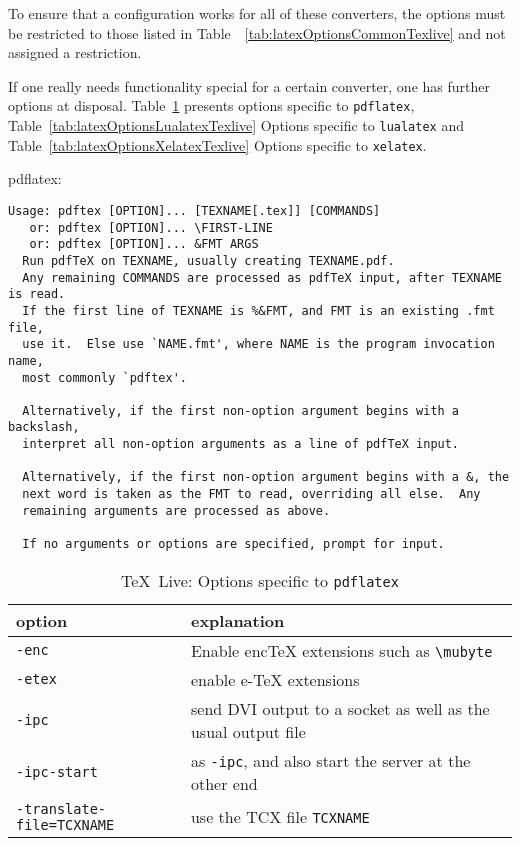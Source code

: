 \documentclass{article}
\newcommand{\pdflatex}{\texttt{pdflatex}}
\newcommand{\lualatex}{\texttt{lualatex}}
\newcommand{\xelatex}{\texttt{xelatex}}
\newcommand{\texlive}{\TeX~Live}
\begin{document}
To ensure that a configuration works for all of these converters, 
the options must be restricted to those listed in Table~~\ref{tab:latexOptionsCommonTexlive} 
and not assigned a restriction. 

If one really needs functionality special for a certain converter, 
one has further options at disposal. 
Table~\ref{tab:latexOptionsPdflatexTexlive} presents options specific to \pdflatex{}, 
Table~\ref{tab:latexOptionsLualatexTexlive} Options specific to \lualatex{} and 
Table~\ref{tab:latexOptionsXelatexTexlive} Options specific to \xelatex. 





pdflatex: 

\begin{verbatim}
Usage: pdftex [OPTION]... [TEXNAME[.tex]] [COMMANDS]
   or: pdftex [OPTION]... \FIRST-LINE
   or: pdftex [OPTION]... &FMT ARGS
  Run pdfTeX on TEXNAME, usually creating TEXNAME.pdf.
  Any remaining COMMANDS are processed as pdfTeX input, after TEXNAME is read.
  If the first line of TEXNAME is %&FMT, and FMT is an existing .fmt file,
  use it.  Else use `NAME.fmt', where NAME is the program invocation name,
  most commonly `pdftex'.

  Alternatively, if the first non-option argument begins with a backslash,
  interpret all non-option arguments as a line of pdfTeX input.

  Alternatively, if the first non-option argument begins with a &, the
  next word is taken as the FMT to read, overriding all else.  Any
  remaining arguments are processed as above.

  If no arguments or options are specified, prompt for input.
\end{verbatim}

  {\small
  \begin{longtable}{|ll|}
  \toprule
  option & explanation \\
  \midrule
  \midrule
  \endfirsthead%
  \bottomrule
  \caption{\label{tab:latexOptionsPdflatexTexlive} \texlive: Options specific to \pdflatex{} }
  \endlastfoot%
  \texttt{-enc}                    & Enable encTeX extensions such as \texttt{\textbackslash{}mubyte} \\
  \texttt{-etex}                   & enable e-TeX extensions \\
  \texttt{-ipc}                    & send DVI output to a socket as well as the usual output file \\
  \texttt{-ipc-start}              & as \texttt{-ipc}, and also start the server at the other end \\
  \texttt{-translate-file=TCXNAME} & use the TCX file \texttt{TCXNAME} \\
  \end{longtable}
  }
\end{document}
